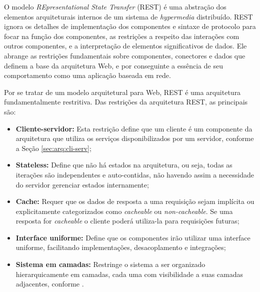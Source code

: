 \begin{citacao}
O modelo \textit{REpresentational State Transfer} (REST) é uma abstração dos elementos arquiteturais internos de um sistema de \textit{hypermedia} distribuído. REST ignora os detalhes de implementação dos componentes e sintaxe de protocolo para focar na função dos componentes, as restrições a respeito das interações com outros componentes, e a interpretação de elementos significativos de dados. Ele abrange as restrições fundamentais sobre componentes, conectores e dados que definem a base da arquitetura Web, e por conseguinte a essência de seu comportamento como uma aplicação baseada em rede.
\end{citacao}

Por se tratar de um modelo arquitetural para Web, REST é uma arquitetura fundamentalmente restritiva. Das restrições da arquitetura REST, as principais são:

\begin{itemize}
    \item \textbf{Cliente-servidor: }Esta restrição define que um cliente é um componente da arquitetura que utiliza os serviços disponibilizados por um servidor, conforme a Seção \ref{sec:arq:cli-serv};

    \item \textbf{Stateless: }Define que não há estados na arquitetura, ou seja, todas as iterações são independentes e auto-contidas, não havendo assim a necessidade do servidor gerenciar estados internamente;

    \item \textbf{Cache: }Requer que os dados de resposta a uma requisição sejam implícita ou explicitamente categorizados como \textit{cacheable} ou \textit{non-cacheable}. Se uma resposta for \textit{cacheable} o cliente poderá utiliza-la para requisições futuras;

    \item \textbf{Interface uniforme: }Define que os componentes irão utilizar uma interface uniforme, facilitando implementações, desacoplamento e integrações;

    \item \textbf{Sistema em camadas: }Restringe o sistema a ser organizado hierarquicamente em camadas, cada uma com visibilidade a suas camadas adjacentes, conforme \cite{garlan:1993}.
\end{itemize}

